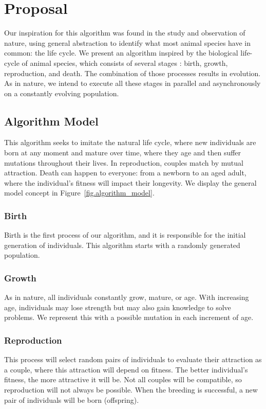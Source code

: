 \documentclass[graybox]{svmult}
\begin{document}
\section{Proposal}
\label{section.proposal}

Our inspiration for this algorithm was found in the study and observation of
nature, using general abstraction to identify what most animal species have in
common: the life cycle. We present an algorithm inspired by the biological
life-cycle of animal species, which consists of several stages
\cite{read1968system}: birth, growth, reproduction, and death. The combination
of those processes results in evolution. As in nature, we intend to execute all
these stages in parallel and asynchronously on a constantly evolving
population.

\subsection{Algorithm Model}

This algorithm seeks to imitate the natural life cycle, where new individuals
are born at any moment and mature over time, where they age and then suffer
mutations throughout their lives. In reproduction, couples match by mutual
attraction. Death can happen to everyone: from a newborn to an aged adult,
where the individual's fitness will impact their longevity. We display the
general model concept in Figure~\ref{fig.algorithm_model}.

\subsubsection{Birth} Birth is the first process of our algorithm, and it is
responsible for the initial generation of individuals. This algorithm starts
with a randomly generated population.

\subsubsection{Growth} As in nature, all individuals constantly grow, mature,
or age. With increasing age, individuals may lose strength but may also gain
knowledge to solve problems. We represent this with a possible mutation in each
increment of age.

\subsubsection{Reproduction} This process will select random pairs of
individuals to evaluate their attraction as a couple, where this attraction
will depend on fitness. The better individual's fitness, the more attractive it
will be. Not all couples will be compatible, so reproduction will not always be
possible. When the breeding is successful, a new pair of individuals will be
born (offspring).
\end{document}
